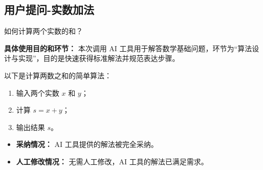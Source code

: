 \subsection{用户提问-实数加法}
\begin{tcolorbox}[colback=orange!10, colframe=orange!60, title={\textcolor{black}{用户提问}}]
如何计算两个实数的和？
\vspace{0.5em}
\begin{flushright}
    \scriptsize
    \begin{flushleft}
        \textbf{具体使用目的和环节：} 本次调用 AI 工具用于解答数学基础问题，环节为“算法设计与实现”，目的是快速获得标准解法并规范表达步骤。
    \end{flushleft}
\end{flushright}
\end{tcolorbox}


\begin{GPTblock}
以下是计算两数之和的简单算法：
\begin{enumerate}
    \item 输入两个实数 $x$ 和 $y$；
    \item 计算 $s = x + y$；
    \item 输出结果 $s$。
\end{enumerate}
\end{GPTblock}

\begin{tcolorbox}[colback=green!10, colframe=green!50, title={\textcolor{black}{采纳和人工修改情况}}]
\begin{itemize}
    \item \textbf{采纳情况：} AI 工具提供的解法被完全采纳。
    \item \textbf{人工修改情况：} 无需人工修改，AI 工具的解法已满足需求。
\end{itemize}
\end{tcolorbox}
